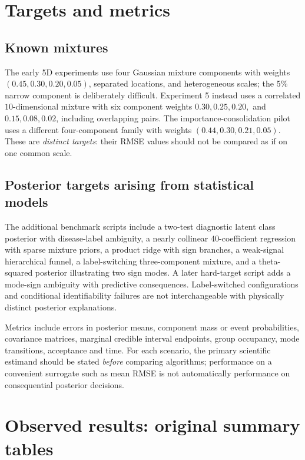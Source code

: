 \documentclass[11pt,letterpaper]{article}
\begin{document}
\section{Targets and metrics}
\subsection{Known mixtures}
The early 5D experiments use four Gaussian mixture components with weights \((0.45,0.30,0.20,0.05)\), separated locations, and heterogeneous scales; the 5\% narrow component is deliberately difficult. Experiment 5 instead uses a correlated \(10\)-dimensional mixture with six component weights $0.30,0.25,0.20,$ and $0.15,0.08,0.02$, including overlapping pairs. The importance-consolidation pilot uses a different four-component family with weights \((0.44,0.30,0.21,0.05)\). These are \emph{distinct targets}: their RMSE values should not be compared as if on one common scale.

\subsection{Posterior targets arising from statistical models}
The additional benchmark scripts include a two-test diagnostic latent class posterior with disease-label ambiguity, a nearly collinear 40-coefficient regression with sparse mixture priors, a product ridge with sign branches, a weak-signal hierarchical funnel, a label-switching three-component mixture, and a theta-squared posterior illustrating two sign modes. A later hard-target script adds a mode-sign ambiguity with predictive consequences. Label-switched configurations and conditional identifiability failures are not interchangeable with physically distinct posterior explanations.

Metrics include errors in posterior means, component mass or event probabilities, covariance matrices, marginal credible interval endpoints, group occupancy, mode transitions, acceptance and time. For each scenario, the primary scientific estimand should be stated \emph{before} comparing algorithms; performance on a convenient surrogate such as mean RMSE is not automatically performance on consequential posterior decisions.

\section{Observed results: original summary tables}
\end{document}
